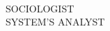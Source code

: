 {{{{        } \po
        \\ \normalsize{%
            SOCIOLOGIST \\ 
            SYSTEM'S ANALYST
            }
     } %
 } %
}%







